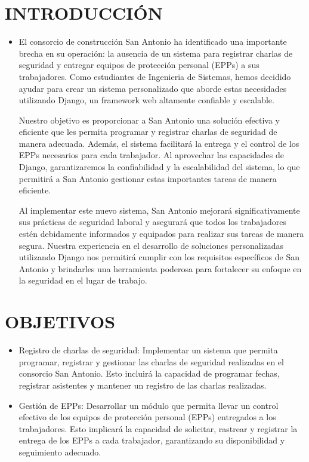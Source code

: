 \documentclass{article}
\begin{document}
\section{INTRODUCCIÓN}
\begin{itemize}
\item El consorcio de construcción San Antonio ha identificado una importante brecha en su operación: la ausencia de un sistema para registrar charlas de seguridad y entregar equipos de protección personal (EPPs) a sus trabajadores. Como estudiantes de Ingenieria de Sistemas, hemos decidido ayudar para crear un sistema personalizado que aborde estas necesidades utilizando Django, un framework web altamente confiable y escalable.

Nuestro objetivo es proporcionar a San Antonio una solución efectiva y eficiente que les permita programar y registrar charlas de seguridad de manera adecuada. Además, el sistema facilitará la entrega y el control de los EPPs necesarios para cada trabajador. Al aprovechar las capacidades de Django, garantizaremos la confiabilidad y la escalabilidad del sistema, lo que permitirá a San Antonio gestionar estas importantes tareas de manera eficiente.

Al implementar este nuevo sistema, San Antonio mejorará significativamente sus prácticas de seguridad laboral y asegurará que todos los trabajadores estén debidamente informados y equipados para realizar sus tareas de manera segura. Nuestra experiencia en el desarrollo de soluciones personalizadas utilizando Django nos permitirá cumplir con los requisitos específicos de San Antonio y brindarles una herramienta poderosa para fortalecer su enfoque en la seguridad en el lugar de trabajo.
\end{itemize}

\section{OBJETIVOS}
\begin{itemize}
\item
Registro de charlas de seguridad: Implementar un sistema que permita programar, registrar y gestionar las charlas de seguridad realizadas en el consorcio San Antonio. Esto incluirá la capacidad de programar fechas, registrar asistentes y mantener un registro de las charlas realizadas.
\item
Gestión de EPPs: Desarrollar un módulo que permita llevar un control efectivo de los equipos de protección  personal (EPPs) entregados a los trabajadores. Esto implicará la capacidad de solicitar, rastrear y registrar la entrega de los EPPs a cada trabajador, garantizando su disponibilidad y seguimiento adecuado.
\end{itemize}
\end{document}

